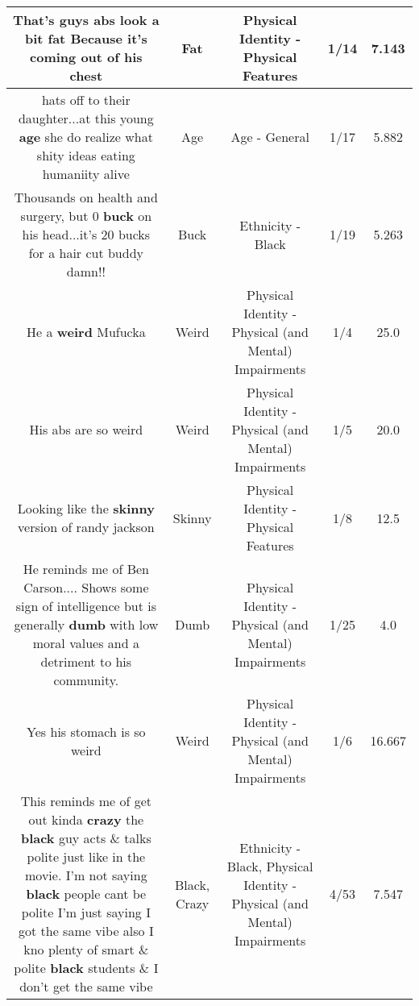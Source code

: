 \documentclass[11pt]{article}
\newlength\mylength
\begin{document}
\begin{center}
\begin{longtable}{|C{.65\mylength}|C{.30\mylength}|C{.12\mylength}|C{.12\mylength}|C{.12\mylength}|}
  \small That's guys abs look a bit \textbf{fat} Because it's coming out of his chest\normalsize   & Fat & Physical Identity - Physical Features & 1/14 & 7.143 \\  \hline
  \small hats off to their daughter...at this young \textbf{age} she do realize what shity ideas eating humaniity alive\normalsize   & Age & Age - General & 1/17 & 5.882 \\  \hline
  \small Thousands on health and surgery, but 0 \textbf{buck} on his head...it's 20 bucks for a hair cut buddy damn!!\normalsize   & Buck & Ethnicity - Black & 1/19 & 5.263 \\  \hline
  \small He a \textbf{weird} Mufucka\normalsize   & Weird & Physical Identity - Physical (and Mental) Impairments & 1/4 & 25.0 \\  \hline
  \small His abs are so weird\normalsize   & Weird & Physical Identity - Physical (and Mental) Impairments & 1/5 & 20.0 \\  \hline
  \small Looking like the \textbf{skinny} version of randy jackson\normalsize   & Skinny & Physical Identity - Physical Features & 1/8 & 12.5 \\  \hline
  \small He reminds me of Ben Carson.... Shows some sign of intelligence but is generally \textbf{dumb} with low moral values and a detriment to his community.\normalsize   & Dumb & Physical Identity - Physical (and Mental) Impairments & 1/25 & 4.0 \\  \hline
  \small Yes his stomach is so weird\normalsize   & Weird & Physical Identity - Physical (and Mental) Impairments & 1/6 & 16.667 \\  \hline
  \small This reminds me of get out kinda \textbf{crazy} the \textbf{black} guy acts \& talks polite just like in the movie. I'm not saying \textbf{black} people cant be polite  I'm just saying I got the same vibe also I kno plenty of smart \& polite \textbf{black} students \& I don't get the same vibe\normalsize   & Black, Crazy & Ethnicity - Black, Physical Identity - Physical (and Mental) Impairments & 4/53 & 7.547 \\  \hline

\end{longtable}
\end{center}
\end{document}
